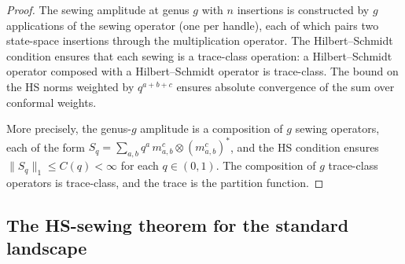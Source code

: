 \begin{proof}
The sewing amplitude at genus $g$ with $n$ insertions is constructed by
$g$ applications of the sewing operator (one per handle), each of which
pairs two state-space insertions through the multiplication operator.
The Hilbert--Schmidt condition ensures that each sewing is a trace-class
operation: a Hilbert--Schmidt operator composed with a Hilbert--Schmidt
operator is trace-class. The bound on the HS norms weighted by $q^{a+b+c}$
ensures absolute convergence of the sum over conformal weights.

More precisely, the genus-$g$ amplitude is a composition of $g$ sewing
operators, each of the form
$S_q = \sum_{a,b} q^a\, m_{a,b}^c \otimes (m^c_{a,b})^*$,
and the HS condition ensures $\|S_q\|_1 \le C(q) < \infty$ for each
$q \in (0,1)$. The composition of $g$ trace-class operators is trace-class,
and the trace is the partition function.
\end{proof}

\subsection{The HS-sewing theorem for the standard landscape}


